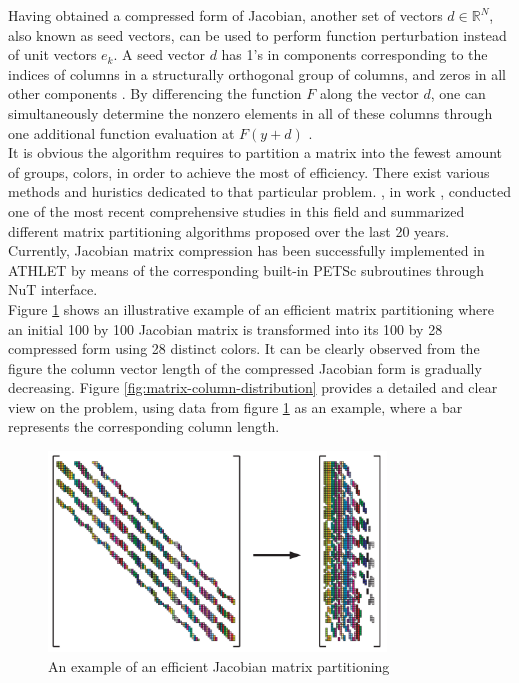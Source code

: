 

Having obtained a compressed form of Jacobian, another set of vectors $d \in \mathbb{R}^{N}$, also known as seed vectors, can be used to perform function perturbation instead of unit vectors $e_{k}$. A seed vector $d$ has 1’s in components corresponding to the indices of columns in a structurally orthogonal group of columns, and zeros in all other components \cite{gebremedhin2005color}. By differencing the function $F$ along the vector $d$, one can simultaneously determine the nonzero elements in all of these columns through one additional function evaluation at $F(y+d)$ \cite{gebremedhin2005color}.\\


It is obvious the algorithm requires to partition a matrix into the fewest amount of groups, colors, in order to achieve the most of efficiency. There exist various methods and huristics dedicated to that particular problem. \citeauthor{gebremedhin2005color}, in work \cite{gebremedhin2005color}, conducted one of the most recent comprehensive studies in this field and summarized different matrix partitioning algorithms proposed over the last 20 years. Currently, Jacobian matrix compression has been successfully implemented in ATHLET by means of the corresponding built-in PETSc subroutines through NuT interface.\\


Figure \ref{fig:matrix-partitioning-example} shows an illustrative example of an efficient matrix partitioning where an initial 100 by 100 Jacobian matrix is transformed into its 100 by 28 compressed form using 28 distinct colors. It can be clearly observed from the figure the column vector length of the compressed Jacobian form is gradually decreasing. Figure \ref{fig:matrix-column-distribution} provides a detailed and clear view on the problem, using data from figure \ref{fig:matrix-partitioning-example} as an example, where a bar represents the corresponding column length.\\


\figpointer{\ref{fig:matrix-partitioning-example}}
\begin{figure}[htpb]
  \centering
  \includegraphics[width=0.8\textwidth]{figures/matrix-compression.png}
  \caption{An example of an efficient Jacobian matrix partitioning \cite{gebremedhin2005color}} \label{fig:matrix-partitioning-example}
\end{figure}


